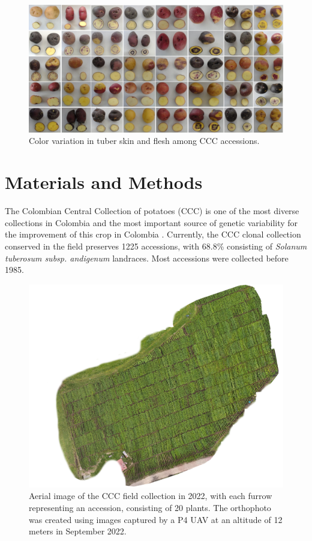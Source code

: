 \documentclass[pdflatex,sn-mathphys-ay]{sn-jnl}%
\begin{document}
\begin{figure}
    \centering
    
    \includegraphics[width=14cm]{Figures/papas_colores.png}

   \caption{Color variation in tuber skin and flesh among CCC accessions.}
    \label{fig:colorpapas}
\end{figure}


\section{Materials and Methods}
The Colombian Central Collection of potatoes (CCC) is one of the most diverse collections in Colombia and the most important source of genetic variability for the improvement of this crop in Colombia \citep{manrique2023defining}. Currently, the CCC clonal collection conserved in the field preserves 1225 accessions, with 68.8\% consisting of  \textit{Solanum tuberosum subsp. andigenum} landraces. Most accessions were collected before 1985. %

\begin{figure}
    \centering
    \includegraphics[width=14cm]{Figures/ortofoto092022.png}
    \caption{Aerial image of the CCC field collection in 2022, with each furrow representing an accession, consisting of 20 plants. The orthophoto was created using images captured by a P4 UAV at an altitude of 12 meters in September 2022.}
    \label{cccfield}
\end{figure}
\end{document}
